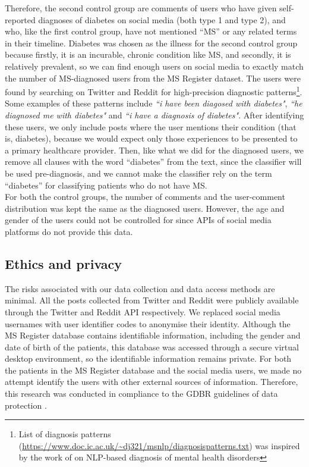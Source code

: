 \documentclass[11pt,a4paper]{article}
\begin{document}
\indent Therefore, the second control group are comments of users who have given self-reported diagnoses of diabetes on social media (both type 1 and type 2), and who, like the first control group, have not mentioned “MS” or any related terms in their timeline. Diabetes was chosen as the illness for the second control group because firstly, it is an incurable, chronic condition like MS, and secondly, it is relatively prevalent, so we can find enough users on social media to exactly match the number of MS-diagnosed users from the MS Register dataset. The users were found by searching on Twitter and Reddit for high-precision diagnostic patterns\footnote{List of diagnosis patterns (\url{https://www.doc.ic.ac.uk/~dj321/msnlp/diagnosispatterns.txt}) was inspired by the work of \citet{Cohan:18} on NLP-based diagnosis of mental health disorders}. Some examples of these patterns include \emph{``i have been diagosed with diabetes"}, \emph{``he diagnosed me with diabetes"} and \emph{``i have a diagnosis of diabetes"}. After identifying these users, we only include posts where the user mentions their condition (that is, diabetes), because we would expect only those experiences to be presented to a primary healthcare provider. Then, like what we did for the diagnosed users, we remove all clauses with the word “diabetes” from the text, since the classifier will be used pre-diagnosis, and we cannot make the classifier rely on the term “diabetes” for classifying patients who do not have MS. \\
\indent For both the control groups, the number of comments and the user-comment distribution was kept the same as the diagnosed users. However, the age and gender of the users could not be controlled for since APIs of social media platforms do not provide this data.
\subsection{Ethics and privacy}
The risks associated with our data collection and data access methods are minimal. All the posts collected from Twitter and Reddit were publicly available through the Twitter and Reddit API respectively. We replaced social media usernames with user identifier codes to anonymise their identity. Although the MS Register database contains identifiable information, including the gender and date of birth of the patients, this database was accessed through a secure virtual desktop environment, so the identifiable information remains private. For both the patients in the MS Register database and the social media users, we made no attempt identify the users with other external sources of information. Therefore, this research was conducted in compliance to the GDBR guidelines of data protection \citep{GDBR:16}.
\end{document}
